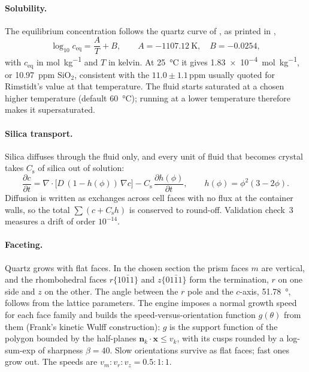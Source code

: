 \documentclass[11pt,a4paper]{article}
\begin{document}
\paragraph{Solubility.} The equilibrium concentration follows the quartz curve of \citet{Rimstidt1997}, as printed in \citet{Takeno2000},
\begin{equation}\label{eq:solubility}
  \log_{10} c_\mathrm{eq} = \frac{A}{T} + B,\qquad A=\SI{-1107.12}{\kelvin},\quad B=-0.0254,
\end{equation}
with $c_\mathrm{eq}$ in \si{\mole\per\kilo\gram} and $T$ in kelvin. At \SI{25}{\celsius} it gives \SI{1.83e-4}{\mole\per\kilo\gram}, or \SI{10.97}{ppm} SiO$_2$, consistent with the $11.0\pm1.1$\,ppm usually quoted for Rimstidt's value at that temperature. The fluid starts saturated at a chosen higher temperature (default \SI{60}{\celsius}); running at a lower temperature therefore makes it supersaturated.

\paragraph{Silica transport.} Silica diffuses through the fluid only, and every unit of fluid that becomes crystal takes $C_\mathrm{s}$ of silica out of solution:
\begin{equation}\label{eq:silica}
  \frac{\partial c}{\partial t} = \nabla\cdot\big[D\,(1-h(\phi))\,\nabla c\big] - C_\mathrm{s}\,\frac{\partial h(\phi)}{\partial t},
  \qquad h(\phi)=\phi^{2}(3-2\phi).
\end{equation}
Diffusion is written as exchanges across cell faces with no flux at the container walls, so the total $\sum(c+C_\mathrm{s}h)$ is conserved to round-off. Validation check~3 measures a drift of order $10^{-14}$.

\paragraph{Faceting.} Quartz grows with flat faces. In the chosen section the prism faces $m$ are vertical, and the rhombohedral faces $r\{10\bar11\}$ and $z\{01\bar11\}$ form the termination, $r$ on one side and $z$ on the other. The angle between the $r$ pole and the $c$-axis, \SI{51.78}{\degree}, follows from the lattice parameters. The engine imposes a normal growth speed for each face family and builds the speed-versus-orientation function $g(\theta)$ from them (Frank's kinetic Wulff construction): $g$ is the support function of the polygon bounded by the half-planes $\mathbf n_k\cdot\mathbf x\le v_k$, with its cusps rounded by a log-sum-exp of sharpness $\beta=40$. Slow orientations survive as flat faces; fast ones grow out. The speeds are $v_m:v_r:v_z=0.5:1:1$.
\end{document}
